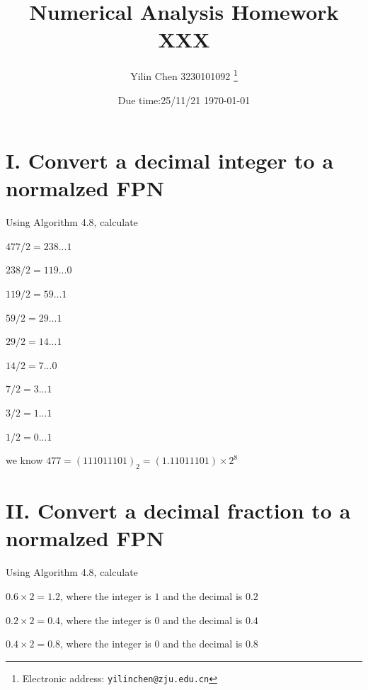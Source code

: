\documentclass[a4paper]{article}
\begin{document}
\title{Numerical Analysis Homework XXX}

\author{Yilin Chen 3230101092
  \thanks{Electronic address: \texttt{yilinchen@zju.edu.cn}}}


\date{Due time:25/11/21 \today}

\maketitle






\section*{I. Convert a decimal integer to a normalzed FPN}

Using Algorithm 4.8, calculate 

$477 / 2 = 238 ... 1$

$238 / 2 = 119 ... 0$

$119 / 2 = 59 ... 1$

$59 / 2 = 29 ... 1$

$29 / 2 = 14 ... 1$

$14 / 2 = 7 ... 0$

$7 / 2 = 3 ... 1$

$3 / 2 = 1 ... 1$

$1 / 2 = 0 ... 1$

we know $477 = (111011101)_2 = (1.11011101) \times 2^{8}$


\section*{II. Convert a decimal fraction to a normalzed FPN}

Using Algorithm 4.8, calculate

$0.6 \times 2 = 1.2$, where the integer is $1$ and the decimal is $0.2$ 

$0.2 \times 2 = 0.4$, where the integer is $0$ and the decimal is $0.4$

$0.4 \times 2 = 0.8$, where the integer is $0$ and the decimal is $0.8$
\end{document}
